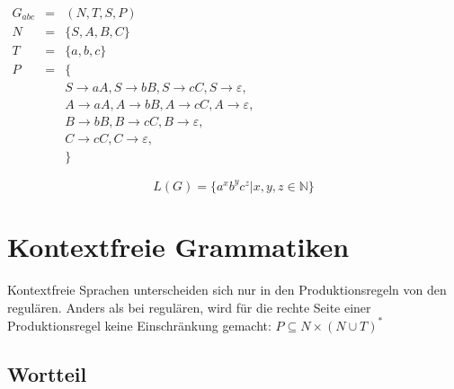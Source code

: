 \documentclass[a4paper,12pt]{report}
\begin{document}
\begin{center}
 $
\begin{array}{rcl}
  G_{abc} &=& (N,T,S,P) \\
  N &=& \{ S, A, B, C \} \\
  T &=& \{ a, b, c \} \\
  P &=& \{ \\ 
  &&  S \rightarrow a A,
    S \rightarrow b B,
    S \rightarrow c C,
    S \rightarrow \varepsilon,\\
  &&  A \rightarrow a A,
    A \rightarrow b B,
    A \rightarrow c C,
    A \rightarrow \varepsilon,\\
  &&  B \rightarrow b B,
    B \rightarrow c C,
    B \rightarrow \varepsilon, \\
  &&  C \rightarrow c C,
    C \rightarrow \varepsilon,\\
  &&\}
\end{array}
\label{regGramEx}
$ 
\end{center}

\[ L(G) = \{ a^xb^yc^z | x,y,z\in \mathbb{N} \} \] 



\section{Kontextfreie Grammatiken}

Kontextfreie Sprachen unterscheiden sich nur in den Produktionsregeln von den regulären. Anders als bei regulären, wird für die rechte Seite einer Produktionsregel keine Einschränkung gemacht: $P \subseteq N\times (N\cup T)^*$

% 


\subsection*{Wortteil}
\end{document}
